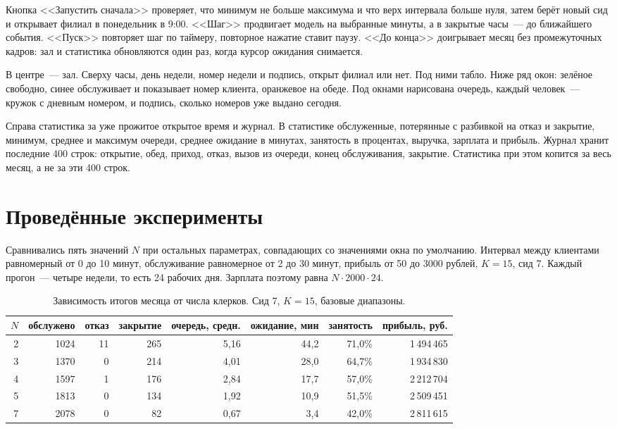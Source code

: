 \documentclass[a4paper,12pt]{article}
\begin{document}
Кнопка <<Запустить сначала>> проверяет, что минимум не больше максимума и что верх интервала больше нуля, затем берёт новый сид и открывает филиал в понедельник в 9:00. <<Шаг>> продвигает модель на выбранные минуты, а в закрытые часы~--- до ближайшего события. <<Пуск>> повторяет шаг по таймеру, повторное нажатие ставит паузу. <<До конца>> доигрывает месяц без промежуточных кадров: зал и статистика обновляются один раз, когда курсор ожидания снимается.

В центре~--- зал. Сверху часы, день недели, номер недели и подпись, открыт филиал или нет. Под ними табло. Ниже ряд окон: зелёное свободно, синее обслуживает и показывает номер клиента, оранжевое на обеде. Под окнами нарисована очередь, каждый человек~--- кружок с дневным номером, и подпись, сколько номеров уже выдано сегодня.

Справа статистика за уже прожитое открытое время и журнал. В статистике обслуженные, потерянные с разбивкой на отказ и закрытие, минимум, среднее и максимум очереди, среднее ожидание в минутах, занятость в процентах, выручка, зарплата и прибыль. Журнал хранит последние 400 строк: открытие, обед, приход, отказ, вызов из очереди, конец обслуживания, закрытие. Статистика при этом копится за весь месяц, а не за эти 400 строк.

\section{Проведённые эксперименты}

Сравнивались пять значений \(N\) при остальных параметрах, совпадающих со значениями окна по умолчанию. Интервал между клиентами равномерный от 0 до 10 минут, обслуживание равномерное от 2 до 30 минут, прибыль от 50 до 3000 рублей, \(K = 15\), сид 7. Каждый прогон~--- четыре недели, то есть 24 рабочих дня. Зарплата поэтому равна \(N \cdot 2000 \cdot 24\).

\begin{table}[H]
\centering
\small
\begin{tabular}{@{}rrrrrrrr@{}}
\toprule
\(N\) & обслужено & отказ & закрытие & очередь, средн. & ожидание, мин & занятость & прибыль, руб. \\
\midrule
2 & 1024 & 11  & 265 & 5,16 & 44,2 & 71,0\% & 1\,494\,465 \\
3 & 1370 & 0   & 214 & 4,01 & 28,0 & 64,7\% & 1\,934\,830 \\
4 & 1597 & 1   & 176 & 2,84 & 17,7 & 57,0\% & 2\,212\,704 \\
5 & 1813 & 0   & 134 & 1,92 & 10,9 & 51,5\% & 2\,509\,451 \\
7 & 2078 & 0   & 82  & 0,67 & 3,4  & 42,0\% & 2\,811\,615 \\
\bottomrule
\end{tabular}
\caption{Зависимость итогов месяца от числа клерков. Сид 7, \(K = 15\), базовые диапазоны.}
\label{tab:clerks}
\end{table}
\end{document}
